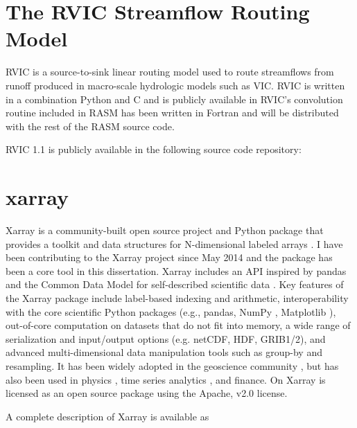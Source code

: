 \section{The RVIC Streamflow Routing Model}
\label{sec:rvic_dev}

RVIC is a source-to-sink linear routing model used to route streamflows from runoff produced in macro-scale hydrologic models such as VIC.
RVIC is written in a combination Python and C and is publicly available in \citet{Hamman_2015}
RVIC's convolution routine included in RASM has been written in Fortran and will be distributed with the rest of the RASM source code.

RVIC 1.1 is publicly available in the following source code repository:


\section{xarray}
\label{sec:xarray_dev}

Xarray is a community-built open source project and Python package that provides a toolkit and data structures for N-dimensional labeled arrays \citep{Hoyer_2016}.
I have been contributing to the Xarray project since May 2014 and the package has been a core tool in this dissertation.
Xarray includes an API inspired by pandas \citep{mckinney_2010} and the Common Data Model for self-described scientific data \citep{Rew_1990,Brown_1993}.
Key features of the Xarray package include label-based indexing and arithmetic, interoperability with the core scientific Python packages (e.g., pandas, NumPy \citep{Jones_2001}, Matplotlib \citep{van_der_Walt_2011}), out-of-core computation on datasets that do not fit into memory, a wide range of serialization and input/output options (e.g. netCDF, HDF, GRIB1/2), and advanced multi-dimensional data manipulation tools such as group-by and resampling.
It has been widely adopted in the geoscience community \citep[e.g.][]{xgcm,Dawson_2016a,Dawson_2016b}, but has also been used in physics \citep[e.g.][]{pycalphad}, time series analytics \citep{cesium}, and finance.
On
Xarray is licensed as an open source package using the Apache, v2.0 license.

A complete description of Xarray is available as

